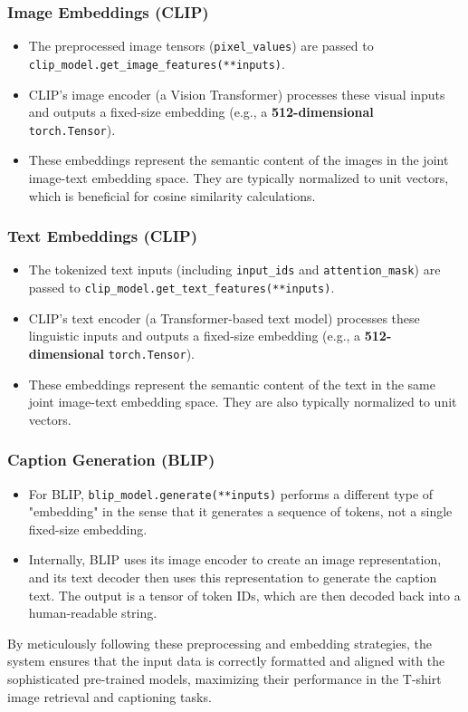 \documentclass{article}
\begin{document}
\subsubsection{Image Embeddings (CLIP)}
\begin{itemize}
    \item The preprocessed image tensors (\texttt{pixel\_values}) are passed to \texttt{clip\_model.get\_image\_features(**inputs)}.
    \item CLIP's image encoder (a Vision Transformer) processes these visual inputs and outputs a fixed-size embedding (e.g., a \textbf{512-dimensional} \texttt{torch.Tensor}).
    \item These embeddings represent the semantic content of the images in the joint image-text embedding space. They are typically normalized to unit vectors, which is beneficial for cosine similarity calculations.
\end{itemize}

\subsubsection{Text Embeddings (CLIP)}
\begin{itemize}
    \item The tokenized text inputs (including \texttt{input\_ids} and \texttt{attention\_mask}) are passed to \texttt{clip\_model.get\_text\_features(**inputs)}.
    \item CLIP's text encoder (a Transformer-based text model) processes these linguistic inputs and outputs a fixed-size embedding (e.g., a \textbf{512-dimensional} \texttt{torch.Tensor}).
    \item These embeddings represent the semantic content of the text in the same joint image-text embedding space. They are also typically normalized to unit vectors.
\end{itemize}

\subsubsection{Caption Generation (BLIP)}
\begin{itemize}
    \item For BLIP, \texttt{blip\_model.generate(**inputs)} performs a different type of "embedding" in the sense that it generates a sequence of tokens, not a single fixed-size embedding.
    \item Internally, BLIP uses its image encoder to create an image representation, and its text decoder then uses this representation to generate the caption text. The output is a tensor of token IDs, which are then decoded back into a human-readable string.
\end{itemize}
By meticulously following these preprocessing and embedding strategies, the system ensures that the input data is correctly formatted and aligned with the sophisticated pre-trained models, maximizing their performance in the T-shirt image retrieval and captioning tasks.
\end{document}
